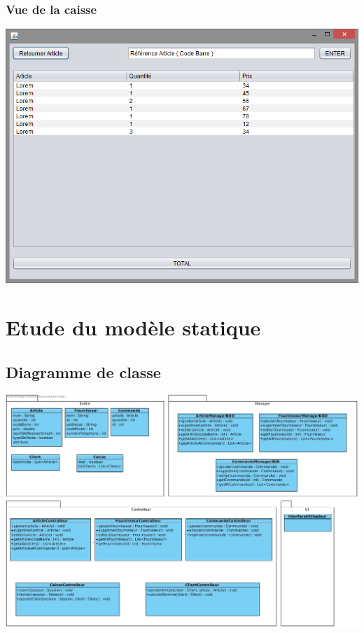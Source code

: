 \subsection{Vue de la caisse}
\begin{center}
	\includegraphics[width=14cm]{Analyse/CaisseView.png}
\end{center}


\chapter{Etude du modèle statique}

\section{Diagramme de classe}
\begin{center}
	\includegraphics[width=14cm]{Analyse/DiagrammeDeClasseEbauche.jpg}
\end{center}

